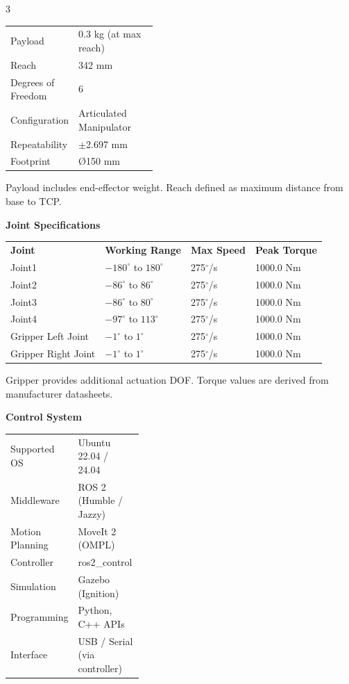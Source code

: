 \documentclass[a4paper,landscape,10pt]{article}
\newcommand{\sectitle}[1]{
    \vspace{0.4cm}
    \colorbox{rowcolor}{
        \parbox{\linewidth}{
            \textbf{\textcolor{maincolor}{#1}}
        }
    }
    \vspace{0.2cm}
}
\begin{document}
\begin{multicols}{3}
\colorbox{rowcolor}{
\parbox{\linewidth}{
\begin{tabularx}{\linewidth}{>{\raggedright\arraybackslash}p{0.42\linewidth} X}
Payload & 0.3 kg (at max reach) \\
Reach & 342 mm\\
Degrees of Freedom & 6 \\
Configuration & Articulated Manipulator \\
Repeatability & $\pm$2.697 mm \\
Footprint & Ø150 mm \\
\end{tabularx}
}
}
\smallskip
{\footnotesize *Payload includes end-effector weight. Reach defined as maximum distance from base to TCP.}

\sectitle{Joint Specifications}

\colorbox{rowcolor}{
\parbox{\linewidth}{
\begin{tabularx}{\linewidth}{l X X X}
\textbf{Joint} & \textbf{Working Range} & \textbf{Max Speed} & \textbf{Peak Torque} \\
Joint1 & $-180^\circ$ to $180^\circ$ & 275$^\circ$/s & 1000.0 Nm \\
Joint2 & $-86^\circ$ to $86^\circ$ & 275$^\circ$/s & 1000.0 Nm \\
Joint3 & $-86^\circ$ to $80^\circ$ & 275$^\circ$/s & 1000.0 Nm \\
Joint4 & $-97^\circ$ to $113^\circ$ & 275$^\circ$/s & 1000.0 Nm \\
Gripper Left Joint & $-1^\circ$ to $1^\circ$ & 275$^\circ$/s & 1000.0 Nm \\
Gripper Right Joint & $-1^\circ$ to $1^\circ$ & 275$^\circ$/s & 1000.0 Nm \\
\end{tabularx}
}
}
\smallskip
{\footnotesize *Gripper provides additional actuation DOF. Torque values are derived from manufacturer datasheets.}

\vfill\null
\pagebreak

\sectitle{Control System}

\colorbox{rowcolor}{
\parbox{\linewidth}{
\begin{tabularx}{\linewidth}{>{\raggedright\arraybackslash}p{0.38\linewidth} X}
Supported OS & Ubuntu 22.04 / 24.04 \\
Middleware & ROS 2 (Humble / Jazzy) \\
Motion Planning & MoveIt 2 (OMPL) \\
Controller & ros2\_control \\
Simulation & Gazebo (Ignition) \\
Programming & Python, C++ APIs \\
Interface & USB / Serial (via controller) \\
\end{tabularx}
}
}


\end{multicols}
\end{document}
